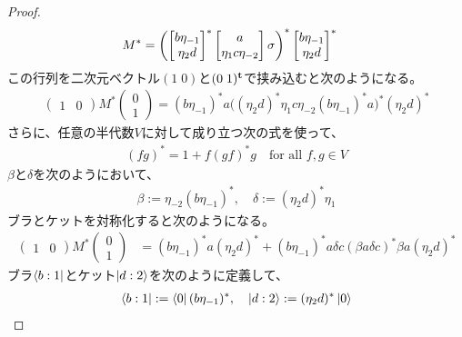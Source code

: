 {\begin{proof}
		\begin{equation*}\begin{split}
			M^* &= \left(
				\begin{bmatrix}{b\eta_{-1}}\\{\eta_2d}\end{bmatrix}^*\begin{bmatrix}{a}\\{\eta_{1}c\eta_{-2}}\end{bmatrix}\sigma
			\right)^*\begin{bmatrix}{b\eta_{-1}}\\{\eta_2d}\end{bmatrix}^*
		\end{split}\end{equation*}
		この行列を二次元ベクトル$(1\;0)$と$(0\;1)^{\mathbf{t}}$で挟み込むと次のようになる。
		\begin{equation*}\begin{split}
			\begin{pmatrix}
				1 & 0
			\end{pmatrix}M^*\begin{pmatrix}
				0 \\ 1
			\end{pmatrix} = (b\eta_{-1})^*a\biggl(
					(\eta_2d)^*\eta_1c\eta_{-2}(b\eta_{-1})^*a
				\biggr)^*(\eta_2d)^*
		\end{split}\end{equation*}
		さらに、任意の半代数$V$に対して成り立つ次の式を使って、
		\begin{equation*}\begin{split}
			(fg)^* = 1 + f(gf)^*g \quad\text{for all } f,g\in V
		\end{split}\end{equation*}
		$\beta$と$\delta$を次のようにおいて、
		\begin{equation*}\begin{split}
			\beta := \eta_{-2}(b\eta_{-1})^*,\quad \delta := (\eta_2d)^*\eta_1
		\end{split}\end{equation*}
		ブラとケットを対称化すると次のようになる。
		\begin{equation}\label{eq:二次元部分の遷移}\begin{split}
			\begin{pmatrix}
				1 & 0
			\end{pmatrix}M^*\begin{pmatrix}
				0 \\ 1
			\end{pmatrix} &= (b\eta_{-1})^*a(\eta_2d)^*
				+ (b\eta_{-1})^*a\delta c(\beta a\delta c)^* \beta a(\eta_2d)^*
		\end{split}\end{equation}
		ブラ$\mathinner{\langle{b:1}|}$とケット$\mathinner{|{d:2}\rangle}$を次のように定義して、
		\begin{equation*}\begin{split}
			\bra{b:1} := \bra{0}(b\eta_{-1})^*,\quad \ket{d:2} := (\eta_2d)^*\ket{0}

\end{split}
\end{equation*}
\end{proof}}
